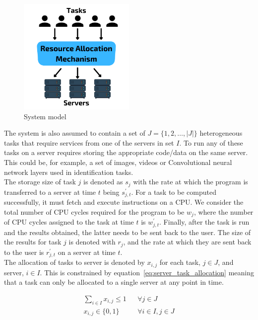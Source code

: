\begin{figure}
    \centering
    \includegraphics[width=0.5\textwidth]{figures/2_solution_figs/system_model.pdf}
    \caption{System model}
    \label{fig:system_model}
\end{figure}

The system is also assumed to contain a set of $J = \{1,2,\ldots,\left| J \right|\}$ heterogeneous tasks that require
services from one of the servers in set $I$. To run any of these tasks on a server requires storing the appropriate
code/data on the same server. This could be, for example, a set of images, videos or Convolutional neural network
layers used in identification tasks.\\
The storage size of task $j$ is denoted as $s_j$ with the rate at which the program is transferred to a server at time
$t$ being $s^{'}_{j,t}$. For a task to be computed successfully, it must fetch and execute instructions
on a CPU. We consider the total number of CPU cycles required for the program to be $w_j$, where the number of
CPU cycles assigned to the task at time $t$ is $w^{'}_{j,t}$. Finally, after the task is run and
the results obtained, the latter needs to be sent back to the user. The size of the results for task $j$ is denoted with
$r_j$, and the rate at which they are sent back to the user is $r^{'}_{j,t}$ on a server at time $t$. \\
The allocation of tasks to server is denoted by $x_{i,j}$ for each task, $j \in J$, and server, $i \in I$. This is
constrained by equation~\eqref{eq:server_task_allocation} meaning that a task can only be allocated to a single server
at any point in time.

\begin{align}
    \sum_{i \in I} x_{i,j} \leq 1 && \forall{j \in J} \label{eq:server_task_allocation} \\
    x_{i,j} \in \{0, 1\} && \forall{i \in I, j \in J} \label{eq:server_task_binary}
\end{align}

